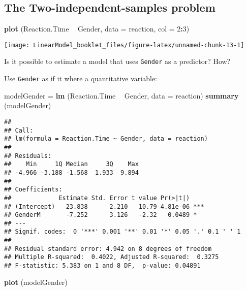 \documentclass[
]{article}
\newenvironment{Shaded}{\begin{snugshade}}{\end{snugshade}}
\newcommand{\DataTypeTok}[1]{\textcolor[rgb]{0.13,0.29,0.53}{#1}}
\newcommand{\DecValTok}[1]{\textcolor[rgb]{0.00,0.00,0.81}{#1}}
\newcommand{\KeywordTok}[1]{\textcolor[rgb]{0.13,0.29,0.53}{\textbf{#1}}}
\newcommand{\NormalTok}[1]{#1}
\newcommand{\OperatorTok}[1]{\textcolor[rgb]{0.81,0.36,0.00}{\textbf{#1}}}
\newcommand{\StringTok}[1]{\textcolor[rgb]{0.31,0.60,0.02}{#1}}
\begin{document}
\hypertarget{the-two-independent-samples-problem}{%
\subsection{The Two-independent-samples
problem}\label{the-two-independent-samples-problem}}

\begin{Shaded}
\begin{Highlighting}[]
\KeywordTok{plot}\NormalTok{ (Reaction.Time }\OperatorTok{~}\StringTok{ }\NormalTok{Gender, }\DataTypeTok{data =}\NormalTok{ reaction, }\DataTypeTok{col =} \DecValTok{2}\OperatorTok{:}\DecValTok{3}\NormalTok{)}
\end{Highlighting}
\end{Shaded}

\begin{center}\texttt{[image: LinearModel\_booklet\_files/figure-latex/unnamed-chunk-13-1]} \end{center}

Is it possible to estimate a model that uses \texttt{Gender} as a
predictor? How?

Use \texttt{Gender} as if it where a quantitative variable:

\begin{Shaded}
\begin{Highlighting}[]
\NormalTok{modelGender =}\StringTok{ }\KeywordTok{lm}\NormalTok{ (Reaction.Time }\OperatorTok{~}\StringTok{ }\NormalTok{Gender, }\DataTypeTok{data =}\NormalTok{ reaction)}
\KeywordTok{summary}\NormalTok{ (modelGender)}
\end{Highlighting}
\end{Shaded}

\begin{verbatim}
## 
## Call:
## lm(formula = Reaction.Time ~ Gender, data = reaction)
## 
## Residuals:
##    Min     1Q Median     3Q    Max 
## -4.966 -3.188 -1.568  1.933  9.894 
## 
## Coefficients:
##             Estimate Std. Error t value Pr(>|t|)    
## (Intercept)   23.838      2.210   10.79 4.81e-06 ***
## GenderM       -7.252      3.126   -2.32   0.0489 *  
## ---
## Signif. codes:  0 '***' 0.001 '**' 0.01 '*' 0.05 '.' 0.1 ' ' 1
## 
## Residual standard error: 4.942 on 8 degrees of freedom
## Multiple R-squared:  0.4022, Adjusted R-squared:  0.3275 
## F-statistic: 5.383 on 1 and 8 DF,  p-value: 0.04891
\end{verbatim}

\begin{Shaded}
\begin{Highlighting}[]
\KeywordTok{plot}\NormalTok{ (modelGender)}
\end{Highlighting}
\end{Shaded}
\end{document}
